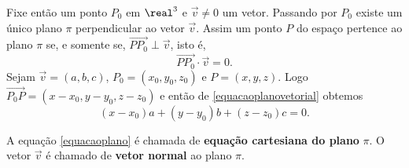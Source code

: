 Fixe ent\~ao um ponto $P_0$ em $\real^3$ e $\vec{v}\ne 0$ um vetor. Passando por $P_0$ existe um \'unico plano $\pi$ perpendicular ao vetor $\vec{v}$. Assim um ponto $P$ do espa\c{c}o pertence ao plano $\pi$ se, e somente se, $\vec{PP_0} \perp \vec{v}$, isto \'e,
\begin{equation}\label{equacaoplanovetorial}
    \vec{PP_0}\cdot\vec{v} = 0.
\end{equation}
Sejam $\vec{v} = (a,b,c)$, $P_0 = (x_0, y_0, z_0)$ e $P = (x, y, z)$. Logo $\vec{P_0P} = (x - x_0, y - y_0, z - z_0)$ e ent\~ao de \eqref{equacaoplanovetorial} obtemos
\begin{equation}\label{equacaoplano}
    (x - x_0)a + (y - y_0)b + (z - z_0)c = 0.
\end{equation}

A equa\c{c}\~ao \eqref{equacaoplano} \'e chamada de \textbf{equa\c{c}\~ao cartesiana do plano} $\pi$. O vetor $\vec{v}$ \'e chamado de \textbf{vetor normal} ao plano $\pi$.

